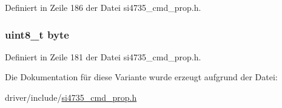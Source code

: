 Definiert in Zeile 186 der Datei si4735\+\_\+cmd\+\_\+prop.\+h.

\hypertarget{unionfm__rds__status__resp12_a96f44d20f1dbf1c8785a7bc99a46164c}{}
\subsubsection[{byte}]{\setlength{\rightskip}{0pt plus 5cm}uint8\+\_\+t byte}\label{unionfm__rds__status__resp12_a96f44d20f1dbf1c8785a7bc99a46164c}


Definiert in Zeile 181 der Datei si4735\+\_\+cmd\+\_\+prop.\+h.



Die Dokumentation für diese Variante wurde erzeugt aufgrund der Datei\+:\begin{DoxyCompactItemize}
\item 
driver/include/\hyperlink{si4735__cmd__prop_8h}{si4735\+\_\+cmd\+\_\+prop.\+h}\end{DoxyCompactItemize}
